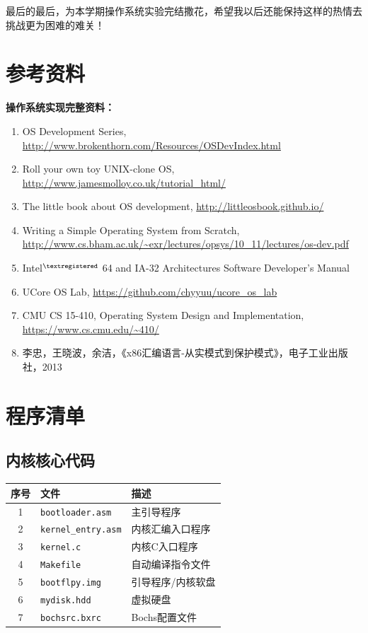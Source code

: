 \documentclass[logo,reportComp]{thesis}
\begin{document}
最后的最后，为本学期操作系统实验完结撒花，希望我以后还能保持这样的热情去挑战更为困难的难关！

\section{参考资料}
\textbf{操作系统实现完整资料：}
\begin{enumerate}
	\item OS Development Series, \url{http://www.brokenthorn.com/Resources/OSDevIndex.html}
	\item Roll your own toy UNIX-clone OS, \url{http://www.jamesmolloy.co.uk/tutorial_html/}
	\item The little book about OS development, \url{http://littleosbook.github.io/}
	\item Writing a Simple Operating System from Scratch, \url{http://www.cs.bham.ac.uk/~exr/lectures/opsys/10_11/lectures/os-dev.pdf}
	\item Intel$^{\textregistered}$ 64 and IA-32 Architectures Software Developer's Manual
	\item UCore OS Lab, \url{https://github.com/chyyuu/ucore_os_lab}
	\item CMU CS 15-410, Operating System Design and Implementation, \url{https://www.cs.cmu.edu/~410/}
	\item 李忠，王晓波，余洁，《x86汇编语言-从实模式到保护模式》，电子工业出版社，2013
\end{enumerate}

\appendix
\appendixconfig
\section{程序清单}
\subsection{内核核心代码}
\begin{center}
\begin{tabular}{|c|l|l|}\hline
\textbf{序号} & \textbf{文件} & \textbf{描述} \\\hline
1 & \verb'bootloader.asm' & 主引导程序\\\hline
2 & \verb'kernel_entry.asm' & 内核汇编入口程序\\\hline
3 & \verb'kernel.c' & 内核C入口程序\\\hline
4 & \verb'Makefile' & 自动编译指令文件\\\hline
5 & \verb'bootflpy.img' & 引导程序/内核软盘\\\hline
6 & \verb'mydisk.hdd' & 虚拟硬盘\\\hline
7 & \verb'bochsrc.bxrc' & Bochs配置文件\\\hline
\end{tabular}
\end{center}
\end{document}

